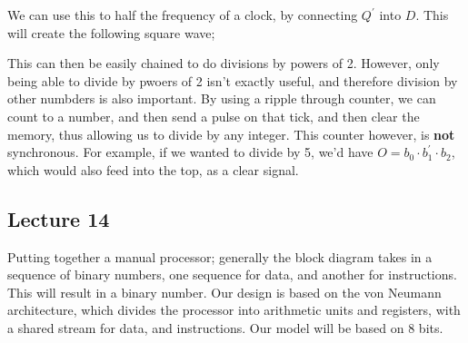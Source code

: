 \documentclass[a4paper, 12pt]{article}
\begin{document}
            We can use this to half the frequency of a clock, by connecting $Q^\prime$ into $D$. This will create the following square wave;
            \begin{center}
            \end{center}
            This can then be easily chained to do divisions by powers of 2. However, only being able to divide by pwoers of 2 isn't exactly useful, and therefore division by other numbders is also important. By using a ripple through counter, we can count to a number, and then send a pulse on that tick, and then clear the memory, thus allowing us to divide by any integer. This counter however, is \textbf{not} synchronous. For example, if we wanted to divide by 5, we'd have $O = b_0 \cdot b_1^\prime \cdot b_2$, which would also feed into the top, as a clear signal.
            \begin{center}
            \end{center}
        \subsection*{Lecture 14}
            Putting together a manual processor; generally the block diagram takes in a sequence of binary numbers, one sequence for data, and another for instructions. This will result in a binary number. Our design is based on the von Neumann architecture, which divides the processor into arithmetic units and registers, with a shared stream for data, and instructions. Our model will be based on 8 bits.
            \medskip
\end{document}
